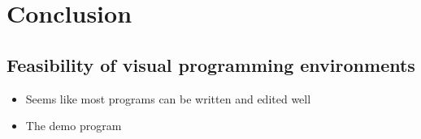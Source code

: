 \chapter{Conclusion}
\section{Feasibility of visual programming environments}
\begin{itemize}[noitemsep]
	\item Seems like most programs can be written and edited well
	\item The demo program
\end{itemize}
